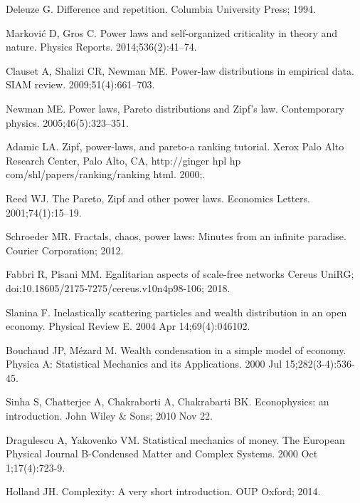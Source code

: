 \documentclass[10pt,letterpaper]{article}
\begin{document}
\begin{thebibliography}{10}
Deleuze G.
\newblock Difference and repetition.
\newblock Columbia University Press; 1994.

Markovi{\'c} D, Gros C.
\newblock Power laws and self-organized criticality in theory and nature.
\newblock Physics Reports. 2014;536(2):41--74.

Clauset A, Shalizi CR, Newman ME.
\newblock Power-law distributions in empirical data.
\newblock SIAM review. 2009;51(4):661--703.

Newman ME.
\newblock Power laws, Pareto distributions and Zipf's law.
\newblock Contemporary physics. 2005;46(5):323--351.

Adamic LA.
\newblock Zipf, power-laws, and pareto-a ranking tutorial.
\newblock Xerox Palo Alto Research Center, Palo Alto, CA, http://ginger hpl hp
  com/shl/papers/ranking/ranking html. 2000;.

Reed WJ.
\newblock The Pareto, Zipf and other power laws.
\newblock Economics Letters. 2001;74(1):15--19.

Schroeder MR.
\newblock Fractals, chaos, power laws: Minutes from an infinite paradise.
\newblock Courier Corporation; 2012.

Fabbri R, Pisani MM.
\newblock Egalitarian aspects of scale-free networks
\newblock Cereus UniRG; doi:10.18605/2175-7275/cereus.v10n4p98-106; 2018.

Slanina F.
\newblock Inelastically scattering particles and wealth distribution in an open economy.
\newblock Physical Review E. 2004 Apr 14;69(4):046102.

Bouchaud JP, Mézard M.
\newblock Wealth condensation in a simple model of economy.
\newblock Physica A: Statistical Mechanics and its Applications. 2000 Jul 15;282(3-4):536-45.

Sinha S, Chatterjee A, Chakraborti A, Chakrabarti BK.
\newblock Econophysics: an introduction.
\newblock John Wiley \& Sons; 2010 Nov 22.

Dragulescu A, Yakovenko VM.
\newblock Statistical mechanics of money.
\newblock The European Physical Journal B-Condensed Matter and Complex Systems. 2000 Oct 1;17(4):723-9.

Holland JH.
\newblock Complexity: A very short introduction.
\newblock OUP Oxford; 2014.


\end{thebibliography}
\end{document}

